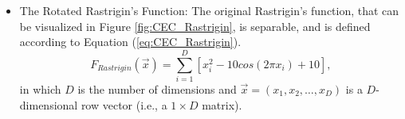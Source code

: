 \begin{itemize}
  \item The Rotated Rastrigin's Function: The original Rastrigin's function, that can be visualized in Figure \ref{fig:CEC_Rastrigin}, is separable, and is defined according to Equation (\ref{eq:CEC_Rastrigin}).
      \begin{equation}\label{eq:CEC_Rastrigin}
      F_{Rastrigin}(\vec{x}) = \sum_{i=1}^{D}[x_i^2 - 10cos(2 \pi x_i) + 10],
      \end{equation}
      in which $D$ is the number of dimensions and $\vec{x} = (x_1, x_2, \ldots, x_D)$ is a $D$-dimensional row vector (i.e., a $1 \times D$ matrix).
      \begin{figure}[!h]
      \centering
      \hspace{1mm}

\end{figure}
\end{itemize}
